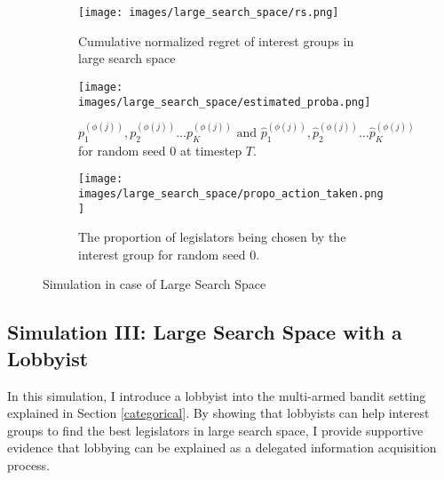 \documentclass{article}
\begin{document}
\begin{figure}[h!]
    \centering %
    \begin{subfigure}[b]{0.45\textwidth}
        \texttt{[image: images/large\_search\_space/rs.png]}
        
        \caption{Cumulative normalized regret of interest groups in large search space}
        \label{fig:rs_lg}
    \end{subfigure}
    \hfill
    \begin{subfigure}[b]{0.45\textwidth}
        \texttt{[image: images/large\_search\_space/estimated\_proba.png]}
        \caption{$p_1^{(\phi(j))}, p_2^{(\phi(j))} \hdots p_K^{(\phi(j))} \text{ and } \hat{p}_1^{(\phi(j))}, \hat{p}_2^{(\phi(j))} \hdots \hat{p}_K^{(\phi(j))}$ for random seed $0$ at timestep $T$.}
        \label{fig:lgproba}
    \end{subfigure}

    \begin{subfigure}[b]{1\columnwidth}
        \centering
        \texttt{[image: images/large\_search\_space/propo\_action\_taken.png]}
        \caption{The proportion of legislators being chosen by the interest group for random seed $0$.}
        \label{fig:lgpropo}
    \end{subfigure}
    \caption{Simulation in case of Large Search Space}
\end{figure}

\subsection{\large{Simulation III: Large Search Space with a Lobbyist}}\label{sim3}

In this simulation, I introduce a lobbyist into the multi-armed bandit setting explained in Section \ref{categorical}.
By showing that lobbyists can help interest groups to find the best legislators in large search space, 
I provide supportive evidence that lobbying can be explained as a delegated information acquisition process.
\end{document}
